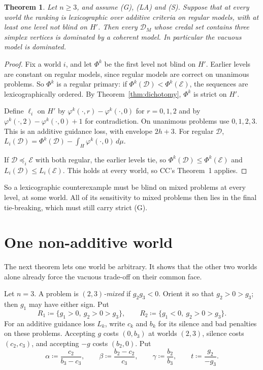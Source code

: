 \documentclass[11pt]{article}
\newtheorem{theorem}{Theorem}
\theoremstyle{remark}\newtheorem{remark}[theorem]{Remark}
\newcommand{\Dscr}{\mathcal D}
\newcommand{\Escr}{\mathcal E}
\begin{document}
\begin{theorem}\label{thm:lex}
Let $n\ge3$, and assume (G), (LA) and (S). Suppose that at every world the
ranking is lexicographic over additive criteria on regular models, with at
least one level not blind on $H'$. Then every $\Dscr_M$ whose credal set
contains three simplex vertices is dominated by a coherent model. In
particular the vacuous model is dominated.
\end{theorem}
\begin{proof}
Fix a world $i$, and let $\Phi^k$ be the first level not blind on $H'$.
Earlier levels are constant on regular models, since regular models are
correct on unanimous problems. So $\Phi^k$ is a regular primary: if
$\Phi^k(\Dscr)<\Phi^k(\Escr)$, the sequences are lexicographically ordered.
By Theorem~\ref{thm:dichotomy}, $\Phi^k$ is strict on $H'$.

Define $\ell_i$ on $H'$ by $\varphi^k(\cdot,r)-\varphi^k(\cdot,0)$ for
$r=0,1,2$ and by $\varphi^k(\cdot,2)-\varphi^k(\cdot,0)+1$ for contradiction.
On unanimous problems use $0,1,2,3$. This is an additive guidance loss, with
envelope $2h+3$. For regular $\Dscr$,
$L_i(\Dscr)=\Phi^k(\Dscr)-\int_H\varphi^k(\cdot,0)\,d\mu$.

If $\Dscr\preceq_i\Escr$ with both regular, the earlier levels tie, so
$\Phi^k(\Dscr)\le\Phi^k(\Escr)$ and $L_i(\Dscr)\le L_i(\Escr)$. This holds at
every world, so CC's Theorem~1 applies.
\end{proof}

So a lexicographic counterexample must be blind on mixed problems at every
level, at some world. All of its sensitivity to mixed problems then lies in
the final tie-breaking, which must still carry strict (G).

\section{One non-additive world}

The next theorem lets one world be arbitrary. It shows that the other two
worlds alone already force the vacuous trade-off on their common face.

Let $n=3$. A problem is \emph{$(2,3)$-mixed} if $g_2g_3<0$. Orient it so that
$g_2>0>g_3$; then $g_1$ may have either sign. Put
\[
 R_1\coloneqq\{g_1>0,\ g_2>0>g_3\},\qquad R_2\coloneqq\{g_1<0,\ g_2>0>g_3\}.
\]
For an additive guidance loss $L_k$, write $c_k$ and $b_k$ for its silence
and bad penalties on these problems. Accepting $g$ costs $(0,b_3)$ at worlds
$(2,3)$, silence costs $(c_2,c_3)$, and accepting $-g$ costs $(b_2,0)$. Put
\[
 \alpha\coloneqq\frac{c_2}{b_3-c_3},\qquad
 \beta\coloneqq\frac{b_2-c_2}{c_3},\qquad
 \gamma\coloneqq\frac{b_2}{b_3},\qquad
 t\coloneqq\frac{g_2}{-g_3}.
\]
\end{document}
